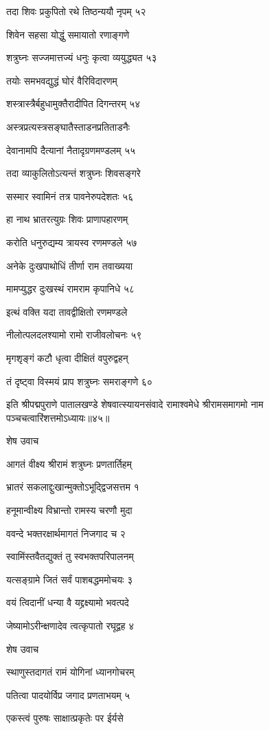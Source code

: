 तदा शिवः प्रकुपितो रथे तिष्ठन्ययौ नृपम् ५२

शिवेन सहसा योद्धुं समायातो रणाङ्गणे

शत्रुघ्नः सज्जमात्तज्यं धनुः कृत्वा व्ययुद्ध्यत ५३

तयोः समभवद्युद्धं घोरं वैरिविदारणम्

शस्त्रास्त्रैर्बहुधामुक्तैरादीपित दिगन्तरम् ५४

अस्त्रप्रत्यस्त्रसङ्घातैस्ताडनप्रतिताडनैः

देवानामपि दैत्यानां नैतादृग्रणमण्डलम् ५५

तदा व्याकुलितोऽत्यन्तं शत्रुघ्नः शिवसङ्गरे

सस्मार स्वामिनं तत्र पावनेरुपदेशतः ५६

हा नाथ भ्रातरत्युग्रः शिवः प्राणापहारणम्

करोति धनुरुद्यम्य त्रायस्व रणमण्डले ५७

अनेके दुःखपाथोधिं तीर्णा राम तवाख्यया

मामप्युद्धर दुःखस्थं रामराम कृपानिधे ५८

इत्थं वक्ति यदा तावद्वीक्षितो रणमण्डले

नीलोत्पलदलश्यामो रामो राजीवलोचनः ५९

मृगशृङ्गं कटौ धृत्वा दीक्षितं वपुरुद्वहन्

तं दृष्ट्वा विस्मयं प्राप शत्रुघ्नः समराङ्गणे ६०

इति श्रीपद्मपुराणे पातालखण्डे शेषवात्स्यायनसंवादे रामाश्वमेधे श्रीरामसमागमो नाम पञ्चचत्वारिंशत्तमोऽध्यायः॥४५॥


शेष उवाच

आगतं वीक्ष्य श्रीरामं शत्रुघ्नः प्रणतार्तिहम्

भ्रातरं सकलाद्दुःखान्मुक्तोऽभूद्द्विजसत्तम १

हनूमान्वीक्ष्य विभ्रान्तो रामस्य चरणौ मुदा

ववन्दे भक्तरक्षार्थमागतं निजगाद च २

स्वामिंस्तवैतद्युक्तं तु स्वभक्तपरिपालनम्

यत्सङ्ग्रामे जितं सर्वं पाशबद्धममोचयः ३

वयं त्विदानीं धन्या वै यद्द्रक्ष्यामो भवत्पदे

जेष्यामोऽरीन्क्षणादेव त्वत्कृपातो रघूद्वह ४

शेष उवाच

स्थाणुस्तदागतं रामं योगिनां ध्यानगोचरम्

पतित्वा पादयोर्विप्र जगाद प्रणताभयम् ५

एकस्त्वं पुरुषः साक्षात्प्रकृतेः पर ईर्यसे

